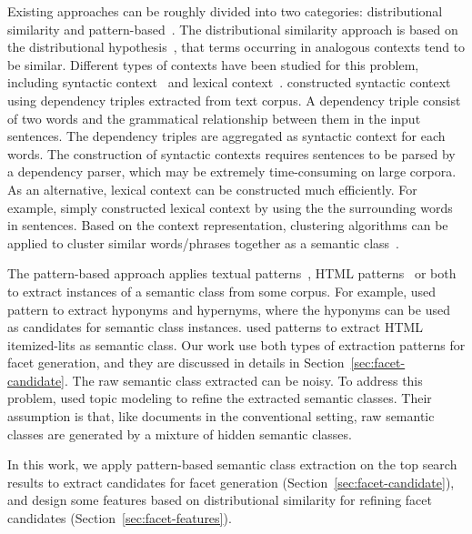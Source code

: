 Existing approaches can be roughly divided into two categories: distributional similarity and pattern-based~\cite{shi2010corpus}. The distributional similarity approach is based on the distributional hypothesis~\cite{Harris}, that terms occurring in analogous contexts tend to be similar. Different types of contexts have been studied for this problem, including syntactic context~\cite{lin1998automatic,pantel2002discovering} and lexical context~\cite{pantel2004towards,agirre2009study,pantel2009web}. \citet{lin1998automatic} constructed syntactic context using dependency triples extracted from text corpus. A dependency triple consist of two words and the grammatical relationship between them in the input sentences. The dependency triples are aggregated as syntactic context for each words. The construction of syntactic contexts requires sentences to be parsed by a dependency parser, which may be extremely time-consuming on large corpora. As an alternative, lexical context can be constructed much efficiently. For 
example, \citet{agirre2009study} simply constructed lexical context by using the the surrounding words in sentences. Based on the context representation, clustering algorithms can be applied to cluster similar words/phrases together as a semantic class~\cite{pantel2002discovering}.


The pattern-based approach applies textual patterns~\cite{hearst1992automatic,pasca2004acquisition}, HTML patterns~\cite{shinzato2005simple} or both~\cite{zhang2009employing,shi2010corpus} to extract instances of a semantic class from some corpus. For example, \citet{hearst1992automatic} used pattern  to extract hyponyms and hypernyms, where the hyponyms can be used as candidates for semantic class instances. \citet{shinzato2005simple} used patterns to extract HTML itemized-lits as semantic class. Our work use both types of extraction patterns for facet generation, and they are discussed in details in Section~\ref{sec:facet-candidate}. The raw semantic class extracted can be noisy. To address this problem, \citet{zhang2009employing} used topic modeling to refine the extracted semantic classes. Their assumption is that, like documents in the conventional setting, raw semantic classes are generated by a mixture of hidden semantic classes.

In this work, we apply pattern-based semantic class extraction on the top search results to extract candidates for facet generation (Section~\ref{sec:facet-candidate}), and design some features based on distributional similarity for refining facet candidates (Section~\ref{sec:facet-features}).


